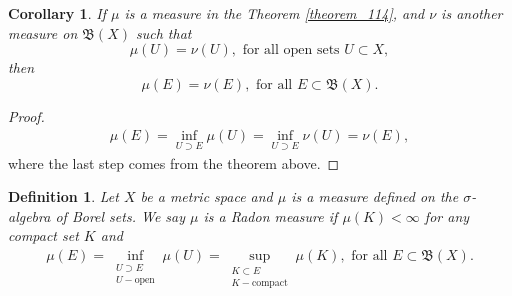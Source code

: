 \documentclass[11pt]{book}
\newtheorem{definition}{Definition}[chapter]
\newtheorem{corollary}{Corollary}[theorem]
\theoremstyle{definition}
\numberwithin{equation}{chapter}
\begin{document}
\medskip

\begin{corollary}\label{coro_191}
If $\mu$ is a measure in the Theorem \ref{theorem_114}, and $\nu$ is another measure on $\mathfrak{B}(X)$ such that 
$$\mu(U) = \nu(U),\,\, \text{for all open sets}\,\, U \subset X,$$ 
 then 
$$\mu(E) = \nu(E),\,\, \text{for all}\,\, E \subset \mathfrak{B}(X).$$
\end{corollary}
\begin{proof}
\begin{align*}
    \mu(E) = \inf_{U \supset E} \mu(U) = \inf_{U \supset E} \nu(U) = \nu(E),
\end{align*}
where the last step comes from the theorem above.
\end{proof}

\medskip

\begin{definition}\label{def_111}
Let $X$ be a metric space and $\mu$ is a measure defined on the $\sigma$-algebra of Borel sets. We say $\mu$ is a Radon measure if $\mu(K) < \infty$ for any compact set $K$ and 
\begin{align*}
    \mu(E) = \inf_{\substack{U \supset E\\ U - \text{open}}} \mu(U) = \sup_{\substack{K \subset E\\ K - \text{compact}}} \mu(K), \,\, \text{for all}\,\, E \subset \mathfrak{B}(X).
\end{align*}
\end{definition}

\medskip
\end{document}

